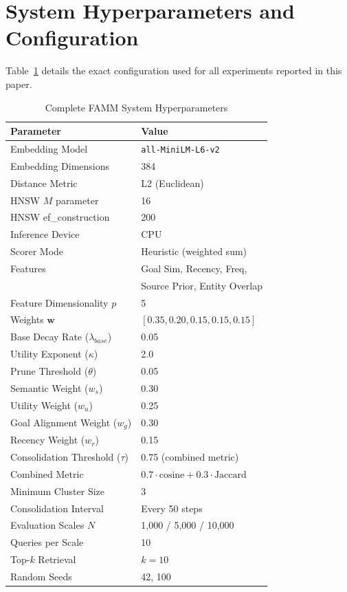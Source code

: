 \appendices
\section{System Hyperparameters and Configuration}

Table~\ref{tab:hyperparams} details the exact configuration used for all experiments reported in this paper.

\begin{table}[h]
\caption{Complete FAMM System Hyperparameters}
\label{tab:hyperparams}
\begin{center}
\begin{tabular}{ll}
\toprule
\textbf{Parameter} & \textbf{Value} \\
\midrule
Embedding Model & \texttt{all-MiniLM-L6-v2} \\
Embedding Dimensions & 384 \\
Distance Metric & L2 (Euclidean) \\
HNSW $M$ parameter & 16 \\
HNSW ef\_construction & 200 \\
Inference Device & CPU \\
\midrule
Scorer Mode & Heuristic (weighted sum) \\
Features & Goal Sim, Recency, Freq, \\
 & Source Prior, Entity Overlap \\
Feature Dimensionality $p$ & 5 \\
Weights $\mathbf{w}$ & $[0.35, 0.20, 0.15, 0.15, 0.15]$ \\
\midrule
Base Decay Rate ($\lambda_{base}$) & 0.05 \\
Utility Exponent ($\kappa$) & 2.0 \\
Prune Threshold ($\theta$) & 0.05 \\
\midrule
Semantic Weight ($w_s$) & 0.30 \\
Utility Weight ($w_u$) & 0.25 \\
Goal Alignment Weight ($w_g$) & 0.30 \\
Recency Weight ($w_r$) & 0.15 \\
\midrule
Consolidation Threshold ($\tau$) & 0.75 (combined metric) \\
Combined Metric & $0.7 \cdot \text{cosine} + 0.3 \cdot \text{Jaccard}$ \\
Minimum Cluster Size & 3 \\
Consolidation Interval & Every 50 steps \\
\midrule
Evaluation Scales $N$ & 1,000 / 5,000 / 10,000 \\
Queries per Scale & 10 \\
Top-$k$ Retrieval & $k = 10$ \\
Random Seeds & 42, 100 \\
\bottomrule
\end{tabular}
\end{center}
\end{table}
